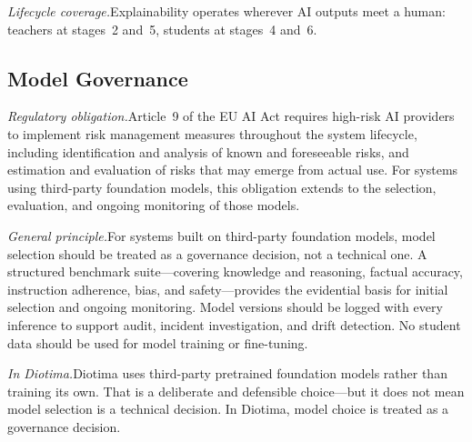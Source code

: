 \documentclass[10pt, a4paper, twocolumn]{article}
\begin{document}
\textit{Lifecycle coverage.}\quad Explainability operates wherever AI outputs meet
a human: teachers at stages~2 and~5, students at stages~4 and~6.

\subsection{Model Governance}

\textit{Regulatory obligation.}\quad Article~9 of the EU AI Act requires high-risk AI
providers to implement risk management measures throughout the system lifecycle,
including identification and analysis of known and foreseeable risks, and estimation
and evaluation of risks that may emerge from actual use. For systems using third-party
foundation models, this obligation extends to the selection, evaluation, and ongoing
monitoring of those models.

\textit{General principle.}\quad For systems built on third-party foundation models,
model selection should be treated as a governance decision, not a technical one. A
structured benchmark suite---covering knowledge and reasoning, factual accuracy,
instruction adherence, bias, and safety---provides the evidential basis for initial
selection and ongoing monitoring. Model versions should be logged with every inference
to support audit, incident investigation, and drift detection. No student data should
be used for model training or fine-tuning.

\textit{In Diotima.}\quad Diotima uses third-party pretrained foundation models
rather than training its own. That is a deliberate and defensible choice---but it does
not mean model selection is a technical decision. In Diotima, model choice is treated
as a governance decision.
\end{document}
